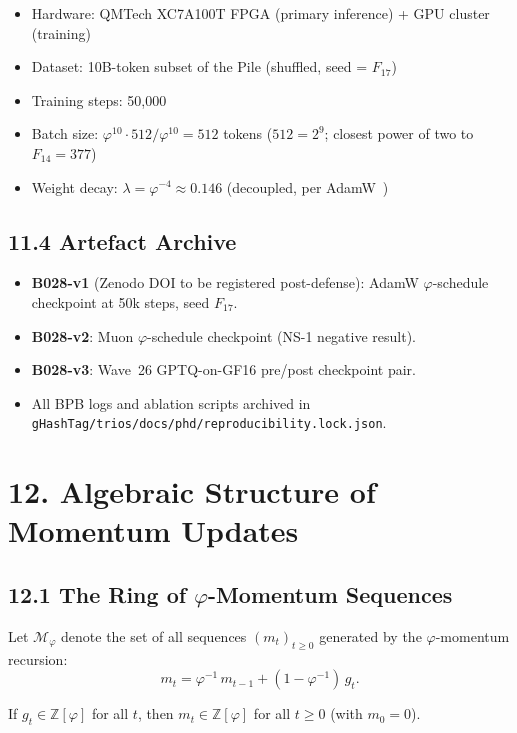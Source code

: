 \begin{itemize}
  \item Hardware: QMTech XC7A100T FPGA (primary inference) +
        GPU cluster (training)
  \item Dataset: 10B-token subset of the Pile
        (shuffled, seed = \(F_{17}\))
  \item Training steps: 50,000
  \item Batch size: \(\varphi^{10} \cdot 512 / \varphi^{10} = 512\)
        tokens (\(512 = 2^9\); closest power of two to \(F_{14} = 377\))
  \item Weight decay: \(\lambda = \varphi^{-4} \approx 0.146\)
        (decoupled, per AdamW~\cite{loshchilov_adamw})
\end{itemize}

\subsection{11.4 Artefact Archive}

\begin{itemize}
  \item \textbf{B028-v1} (Zenodo DOI to be registered post-defense):
        AdamW \(\varphi\)-schedule checkpoint at 50k steps, seed \(F_{17}\).
  \item \textbf{B028-v2}: Muon \(\varphi\)-schedule checkpoint (NS-1 negative result).
  \item \textbf{B028-v3}: Wave~26 GPTQ-on-GF16 pre/post checkpoint pair.
  \item All BPB logs and ablation scripts archived in
        \texttt{gHashTag/trios/docs/phd/reproducibility.lock.json}.
\end{itemize}

\section{12. Algebraic Structure of Momentum Updates}
\label{sec:28-algebra}

\subsection{12.1 The Ring of \(\varphi\)-Momentum Sequences}

Let \(\mathcal{M}_\varphi\) denote the set of all sequences
\((m_t)_{t \geq 0}\) generated by the \(\varphi\)-momentum recursion:
\[
  m_t = \varphi^{-1}\, m_{t-1} + (1-\varphi^{-1})\, g_t.
\]
\begin{proposition}
  \label{prop:momentum-ring}
  If \(g_t \in \mathbb{Z}[\varphi]\) for all \(t\), then
  \(m_t \in \mathbb{Z}[\varphi]\) for all \(t \geq 0\) (with
  \(m_0 = 0\)).
\end{proposition}

